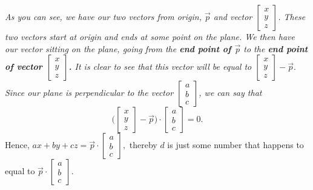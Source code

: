 \documentclass[addpoints]{exam}
\begin{document}
\textit{
As you can see, we have our two vectors from origin, $\vec{p}$ and vector $\begin{bmatrix}
    x\\y\\z
\end{bmatrix}$. These two vectors start at origin and ends at some point on the plane. We then have our vector sitting on the plane, going from the \textbf{end point of $\vec{p}$} to the \textbf{end point of vector $\begin{bmatrix}
    x\\y\\z
\end{bmatrix}$.} It is clear to see that this vector will be equal to $\begin{bmatrix}
    x\\y\\z
\end{bmatrix}-\vec{p}.$ Since our plane is perpendicular to the vector $\begin{bmatrix}
    a\\b\\c
\end{bmatrix}$, we can say that}
\[
\Big(\begin{bmatrix}
    x\\y\\z
\end{bmatrix}-\vec{p}\Big)\cdot\begin{bmatrix}
    a\\b\\c
\end{bmatrix}=0.
\] Hence, $ax+by+cz=\vec{p}\cdot\begin{bmatrix}
    a\\b\\c
\end{bmatrix},$ thereby $d$ is just some number that happens to equal to $\vec{p}\cdot\begin{bmatrix}
    a\\b\\c
\end{bmatrix}.$
\end{document}
